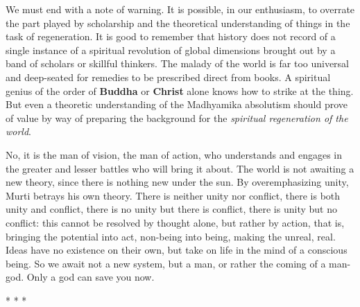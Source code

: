 \begin{quotex}
We must end with a note of warning. It is possible, in our enthusiasm, to overrate the part played by scholarship and the theoretical understanding of things in the task of regeneration. It is good to remember that history does not record of a single instance of a spiritual revolution of global dimensions brought out by a band of scholars or skillful thinkers. The malady of the world is far too universal and deep-seated for remedies to be prescribed direct from books. A spiritual genius of the order of \textbf{Buddha} or \textbf{Christ} alone knows how to strike at the thing. But even a theoretic understanding of the Madhyamika absolutism should prove of value by way of preparing the background for the \emph{spiritual regeneration of the world}.

\end{quotex}
No, it is the man of vision, the man of action, who understands and engages in the greater and lesser battles who will bring it about. The world is not awaiting a new theory, since there is nothing new under the sun. By overemphasizing unity, Murti betrays his own theory. There is neither unity nor conflict, there is both unity and conflict, there is no unity but there is conflict, there is unity but no conflict: this cannot be resolved by thought alone, but rather by action, that is, bringing the potential into act, non-being into being, making the unreal, real. Ideas have no existence on their own, but take on life in the mind of a conscious being. So we await not a new system, but a man, or rather the coming of a man-god. Only a god can save you now.




\begin{center}* * *\end{center}


